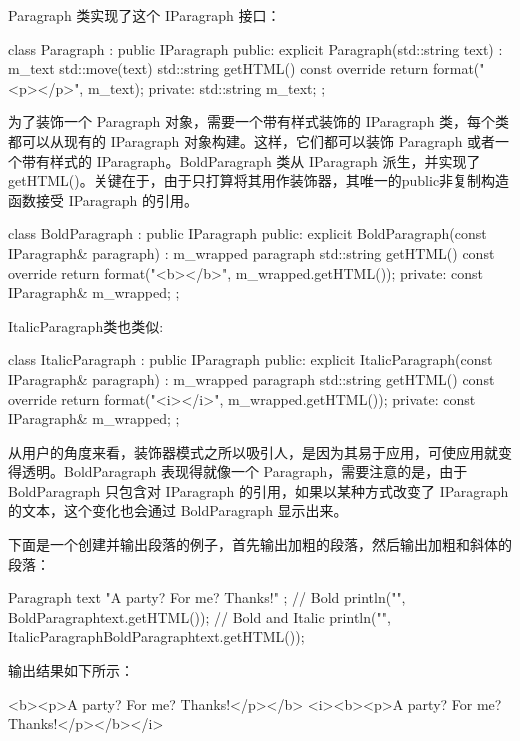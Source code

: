 Paragraph 类实现了这个 IParagraph 接口：

\begin{cpp}
class Paragraph : public IParagraph
{
    public:
        explicit Paragraph(std::string text) : m_text { std::move(text) } {}
        std::string getHTML() const override {return format("<p>{}</p>", m_text); }
    private:
        std::string m_text;
};
\end{cpp}

为了装饰一个 Paragraph 对象，需要一个带有样式装饰的 IParagraph 类，每个类都可以从现有的 IParagraph 对象构建。这样，它们都可以装饰 Paragraph 或者一个带有样式的 IParagraph。BoldParagraph 类从 IParagraph 派生，并实现了 getHTML()。关键在于，由于只打算将其用作装饰器，其唯一的public非复制构造函数接受 IParagraph 的引用。

\begin{cpp}
class BoldParagraph : public IParagraph
{
    public:
        explicit BoldParagraph(const IParagraph& paragraph)
        : m_wrapped { paragraph } { }
        std::string getHTML() const override {
            return format("<b>{}</b>", m_wrapped.getHTML()); }
    private:
        const IParagraph& m_wrapped;
};
\end{cpp}

ItalicParagraph类也类似:

\begin{cpp}
class ItalicParagraph : public IParagraph
{
    public:
        explicit ItalicParagraph(const IParagraph& paragraph)
        : m_wrapped { paragraph } { }
        std::string getHTML() const override {
            return format("<i>{}</i>", m_wrapped.getHTML()); }
    private:
        const IParagraph& m_wrapped;
};
\end{cpp}


从用户的角度来看，装饰器模式之所以吸引人，是因为其易于应用，可使应用就变得透明。BoldParagraph 表现得就像一个 Paragraph，需要注意的是，由于 BoldParagraph 只包含对 IParagraph 的引用，如果以某种方式改变了 IParagraph 的文本，这个变化也会通过 BoldParagraph 显示出来。

下面是一个创建并输出段落的例子，首先输出加粗的段落，然后输出加粗和斜体的段落：

\begin{cpp}
Paragraph text { "A party? For me? Thanks!" };
// Bold
println("{}", BoldParagraph{text}.getHTML());
// Bold and Italic
println("{}", ItalicParagraph{BoldParagraph{text}}.getHTML());
\end{cpp}

输出结果如下所示：

\begin{shell}
<b><p>A party? For me? Thanks!</p></b>
<i><b><p>A party? For me? Thanks!</p></b></i>
\end{shell}
















